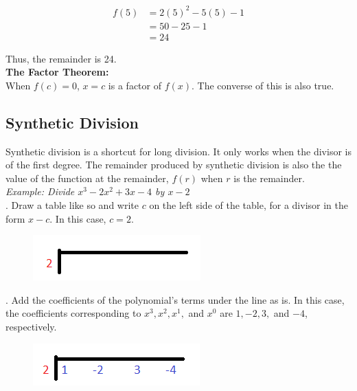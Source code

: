 \documentclass{article}
\begin{document}
    \begin{align*}
        f(5) &= 2(5)^2-5(5)-1 \\
        &= 50-25-1 \\
        &= 24
    \end{align*}

    \noindent Thus, the remainder is 24. \\
    \noindent \color{purple} \textbf{The Factor Theorem:} \color{black} \\
    When $f(c)=0$, $x=c$ is a factor of $f(x)$. The converse of this is also true.

    \subsection{Synthetic Division}

    Synthetic division is a shortcut for long division. It only works when the divisor is
    of the first degree. The remainder produced by synthetic division is also the the value
    of the function at the remainder, $f(r)$ when $r$ is the remainder. \\

    \noindent \color{blue} \textit{Example: Divide $x^3-2x^2+3x-4$ by $x-2$} \color{black} \\

    . Draw a table like so and write $c$ on the left side of the table, for a
    divisor in the form $x-c$. In this case, $c=2$. \\

    \begin{figure} [hbt!]
        \centering
        \includegraphics [scale = 0.5] {Resources/Unit3Polynomials/synthdiv1.png}
    \end{figure}

    . Add the coefficients of the polynomial's terms under the line as is. In
    this case, the coefficients corresponding to $x^3, x^2, x^1,$ and $x^0$ are $1,-2,3,$
    and $-4$, respectively. \\

    \begin{figure} [hbt!]
        \centering
        \includegraphics [scale = 0.5] {Resources/Unit3Polynomials/synthdiv2.png}
    \end{figure}
\end{document}
